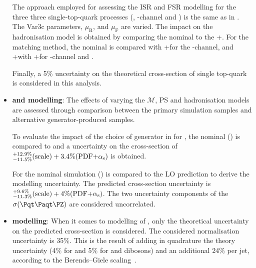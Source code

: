 \begin{itemize}
		The approach employed for assessing the ISR
		and FSR modelling for the three three single-top-quark processes (\tchannel, \tW-channel and \schannel)  
		is the same as in \ttH. The Var3c parameters, $\mu_{\text{R}}$, and $\mu_{\text{F}}$ are varied.
		The impact on the hadronisation model is obtained by comparing the nominal to the
		\POWHEG+\HERWIG[7.1.6]. For the matching method, the nominal is compared with
		\AMCatNLO+\PYTHIA[8] for the \tW-channel, and \POWHEG+\HERWIG[7.1.6] with 
		\AMCatNLO+\HERWIG[7.1.6] for \tW-channel and \schannel.
		
		Finally, a 5\% uncertainty on the theoretical cross-section of single top-quark is considered 
		in this analysis.



	\item \textbf{\ttW and \ttZ modelling}: 
		The effects of varying the $\mathcal{M}$, PS and hadronisation models are 
		assessed through comparison between the primary simulation samples and 
		alternative generator-produced samples. 
	
		To evaluate the impact of the choice of generator in for \ttW,
		the nominal (\SHERPA[2.2.10]) is compared to \MGNLO[2.3.3] and a uncertainty on the cross-section of  
		$^{+12.9\%}_{-11.5\%}(\text{scale})+3.4\%(\text{PDF+\ensuremath{\alpha_{\text{s}}}})$ is obtained. 
		
		For \ttZ the nominal simulation (\MGNLO[2.3.3]) is compared to the \SHERPA[2.2.0] LO 
		prediction to derive the modelling uncertainty. 
		The predicted \ttZ cross-section uncertainty 
		is $^{+9.6\%}_{-11.3\%}(\text{scale})+4\%(\text{PDF+\ensuremath{\alpha_{\text{s}}}})$. 
		The two uncertainty components of the $\sigma(\ttZ)$ are considered uncorrelated.
		
	
	\item \textbf{\Zjets modelling}: When it comes to modelling of \Zjets, only the theoretical uncertainty on the 
	predicted cross-section is considered. The considered normalisation uncertainty is 35\%. %
	This is the result of adding in quadrature the theory uncertainty (4\% for \Wjets and 5\% 
	for \Zjets and dibosons) and an additional 24\% per jet, according to the Berends–Giele scaling~\cite{Berends:1991}.


\end{itemize}
